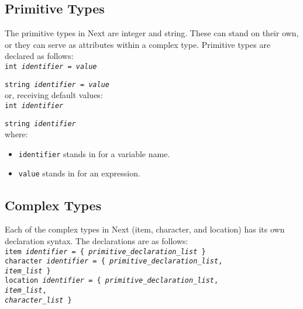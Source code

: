 \documentclass[12pt]{article}
\begin{document}
\subsection{Primitive Types}
The primitive types in Next are integer and string.  These can stand on their own, or they can serve as attributes within a complex type.  Primitive types are declared as follows: \\

\texttt{int \textit{identifier} = \textit{value}}

\texttt{string \textit{identifier} = \textit{value}} \\ 

\noindent or, receiving default values: \\

\texttt{int \textit{identifier}}

\texttt{string \textit{identifier}} \\ 

\noindent where:
\begin{itemize}
\item \texttt{identifier} stands in for a variable name.
\item \texttt{value} stands in for an expression.
\end{itemize}

\subsection{Complex Types}
Each of the complex types in Next (item, character, and location) has its own declaration syntax.  The declarations are as follows: \\

\texttt{item \textit{identifier} = \{ \textit{primitive\_declaration\_list} \}} \\

\texttt{character \textit{identifier} = \{ \textit{primitive\_declaration\_list}, \\
\indent \indent \indent \indent \indent \indent \indent \indent \indent \indent  \textit{item\_list} \} } \\

\texttt{location \textit{identifier} = \{ \textit{primitive\_declaration\_list}, \\
\indent \indent \indent \indent \indent \indent \indent \indent \indent \indent  \textit{item\_list}, \\
\indent \indent \indent \indent \indent \indent \indent \indent \indent \indent  \textit{character\_list} \}} \\
\end{document}
